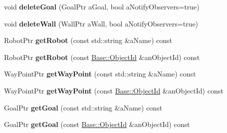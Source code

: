 \begin{DoxyCompactItemize}
\item 
void {\bfseries delete\+Goal} (Goal\+Ptr a\+Goal, bool a\+Notify\+Observers=true)\hypertarget{class_model_1_1_robot_world_a5208d73a57a8b663f4de407150fb8379}{}\label{class_model_1_1_robot_world_a5208d73a57a8b663f4de407150fb8379}

\item 
void {\bfseries delete\+Wall} (Wall\+Ptr a\+Wall, bool a\+Notify\+Observers=true)\hypertarget{class_model_1_1_robot_world_a25c789a5165ee686ef21e1492aace738}{}\label{class_model_1_1_robot_world_a25c789a5165ee686ef21e1492aace738}

\item 
Robot\+Ptr {\bfseries get\+Robot} (const std\+::string \&a\+Name) const \hypertarget{class_model_1_1_robot_world_aa65fc818fe12a23953ac53f7f62705fb}{}\label{class_model_1_1_robot_world_aa65fc818fe12a23953ac53f7f62705fb}

\item 
Robot\+Ptr {\bfseries get\+Robot} (const \hyperlink{class_base_1_1_object_id}{Base\+::\+Object\+Id} \&an\+Object\+Id) const \hypertarget{class_model_1_1_robot_world_ac7897e5aa501752e5e93b555efbf752a}{}\label{class_model_1_1_robot_world_ac7897e5aa501752e5e93b555efbf752a}

\item 
Way\+Point\+Ptr {\bfseries get\+Way\+Point} (const std\+::string \&a\+Name) const \hypertarget{class_model_1_1_robot_world_a4ec5350ad359e9b37bd2f5606a86fea1}{}\label{class_model_1_1_robot_world_a4ec5350ad359e9b37bd2f5606a86fea1}

\item 
Way\+Point\+Ptr {\bfseries get\+Way\+Point} (const \hyperlink{class_base_1_1_object_id}{Base\+::\+Object\+Id} \&an\+Object\+Id) const \hypertarget{class_model_1_1_robot_world_a6ce03ec6f6f106172053cdd789844347}{}\label{class_model_1_1_robot_world_a6ce03ec6f6f106172053cdd789844347}

\item 
Goal\+Ptr {\bfseries get\+Goal} (const std\+::string \&a\+Name) const \hypertarget{class_model_1_1_robot_world_aae1b5a0410c5ae207cd8b7525e204cc0}{}\label{class_model_1_1_robot_world_aae1b5a0410c5ae207cd8b7525e204cc0}

\item 
Goal\+Ptr {\bfseries get\+Goal} (const \hyperlink{class_base_1_1_object_id}{Base\+::\+Object\+Id} \&an\+Object\+Id) const \hypertarget{class_model_1_1_robot_world_a3a678aa437a062c21acccf9ed105a3ec}{}\label{class_model_1_1_robot_world_a3a678aa437a062c21acccf9ed105a3ec}


\end{DoxyCompactItemize}
